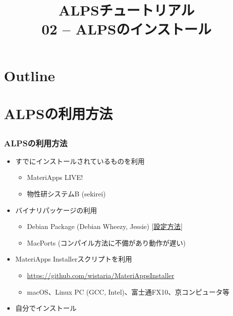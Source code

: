 \title{ALPSチュートリアル \\ 02 -- ALPSのインストール}



\begin{frame}
  \titlepage
\end{frame}

\section*{Outline}
\begin{frame}
  \tableofcontents
\end{frame}

\section{ALPSの利用方法}

\subsection*{\redb\whiteb\greenb}
\begin{frame}[fragile]
  \frametitle{ALPSの利用方法}
  \begin{itemize}
    \setlength{\itemsep}{1em}
  \item すでにインストールされているものを利用
    \begin{itemize}
    \item MateriApps LIVE!
    \item 物性研システムB (sekirei)
    \end{itemize}
  \item バイナリパッケージの利用
    \begin{itemize}
    \item Debian Package (Debian Wheezy, Jessie) [\href{https://github.com/cmsi/MateriAppsLive/wiki/UsingMateriAppsInDebian}{設定方法}]
    \item MacPorts (コンパイル方法に不備があり動作が遅い)
    \end{itemize}
  \item MateriApps Installerスクリプトを利用
    \begin{itemize}
    \item \url{https://github.com/wistaria/MateriAppsInstaller}
    \item macOS、Linux PC (GCC, Intel)、富士通FX10、京コンピュータ等
    \end{itemize}
  \item 自分でインストール
  \end{itemize}
\end{frame}

